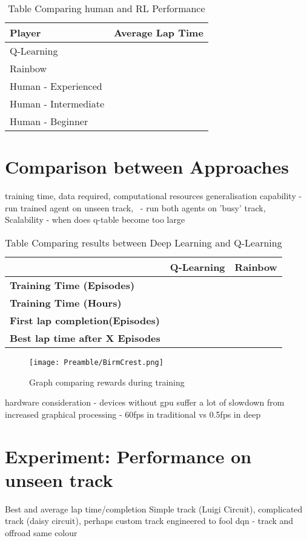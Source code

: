 \begin{table}[htb]
    \centering
    \begin{tabular}{l|l}
    \textbf{Player} & \textbf{Average Lap Time}\\
    \hline
    Q-Learning    &  \\
    Rainbow & \\
    Human - Experienced & \\
    Human - Intermediate & \\
    Human - Beginner &  
    \end{tabular}
    \caption{Table Comparing human and RL Performance}
    \label{tab:lap-times}
\end{table}
\section{Comparison between Approaches}
training time, data required, computational resources
generalisation capability - run trained agent on unseen track, \ - run both agents on 'busy' track, \\Scalability - when does q-table become too large
\begin{table}[hb]
    \centering
    \begin{tabular}{l|c|l}
    & \textbf{Q-Learning} & \textbf{Rainbow}\\
    \hline
    \textbf{Training Time (Episodes)}  &   &  \\
    \textbf{Training Time (Hours)}   &  &  \\
    \textbf{First lap completion(Episodes)}   &  &  \\
    \textbf{Best lap time after X Episodes}   &  &  \\
    \end{tabular}
    \caption{Table Comparing results between Deep Learning and Q-Learning}
    \label{tab:rl-comparison}
\end{table}
\begin{figure}
    \centering
    \texttt{[image: Preamble/BirmCrest.png]}
    \caption{Graph comparing rewards during training}
    \label{fig:q-vs-deep-rewards}
\end{figure}

hardware consideration - devices without gpu suffer a lot of slowdown from increased graphical processing - 60fps in traditional vs 0.5fps in deep
\section{Experiment: Performance on unseen track}
Best and average lap time/completion
Simple track (Luigi Circuit), complicated track (daisy circuit), perhaps custom track engineered to fool dqn - track and offroad same colour